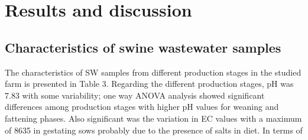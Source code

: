 \section{Results and discussion}
\subsection{Characteristics of swine wastewater samples}
The characteristics of SW samples from different production stages in the studied farm is presented in Table 3. Regarding the different production stages, pH was 7.83 with some variability; one way ANOVA analysis showed significant differences among production stages with higher pH values for weaning and fattening phases. Also significant was the variation in EC values with a maximum of 8635  in gestating sows probably due to the presence of salts in diet. In terms of